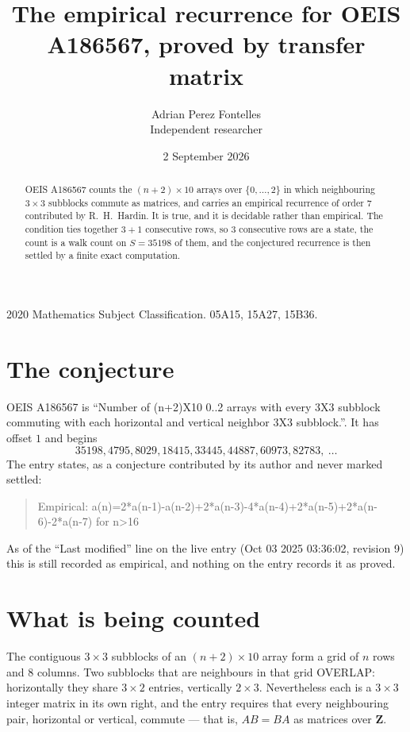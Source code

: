 \documentclass[11pt,a4paper]{article}
\title{The empirical recurrence for OEIS A186567, proved by transfer matrix}
\author{Adrian Perez Fontelles\\ \small Independent researcher}
\date{2 September 2026}
\theoremstyle{plain}
\theoremstyle{definition}
\begin{document}
\maketitle

\begin{abstract}
OEIS A186567 counts the $(n+2)\times10$ arrays over $\{0,\dots,2\}$ in which
neighbouring $3\times3$ subblocks commute as matrices, and carries an empirical
recurrence
of order $7$ contributed by R.~H.~Hardin. It is true, and it is decidable rather than
empirical. The condition ties together $3+1$ consecutive rows, so $3$ consecutive rows are
a state, the count is a walk count on $S=35198$ of them, and the conjectured recurrence is then
settled by a finite exact computation.
\end{abstract}

\noindent\small 2020 Mathematics Subject Classification. 05A15, 15A27, 15B36.\normalsize

\section{The conjecture}

OEIS A186567 is ``Number of (n+2)X10 0..2 arrays with every 3X3 subblock commuting with each horizontal and vertical neighbor 3X3 subblock.''. It has offset $1$ and begins
\[
35198, 4795, 8029, 18415, 33445, 44887, 60973, 82783,\ \dots
\]
The entry states, as a conjecture contributed by its author and never marked settled:
\begin{quote}
Empirical: a(n)=2*a(n-1)-a(n-2)+2*a(n-3)-4*a(n-4)+2*a(n-5)+2*a(n-6)-2*a(n-7) for n>16
\end{quote}
As of the ``Last modified'' line on the live entry (Oct 03 2025 03:36:02, revision 9) this is still
recorded as empirical, and nothing on the entry records it as proved.

\section{What is being counted}

The contiguous $3\times3$ subblocks of an $(n+2)\times10$ array form a grid of $n$
rows and $8$ columns. Two subblocks that are neighbours in that
grid OVERLAP: horizontally they share $3\times2$ entries, vertically
$2\times3$. Nevertheless each is a $3\times3$ integer matrix in its own right, and
the entry requires that every neighbouring pair, horizontal or vertical, commute --- that is,
$AB=BA$ as matrices over $\mathbf{Z}$.
\end{document}
